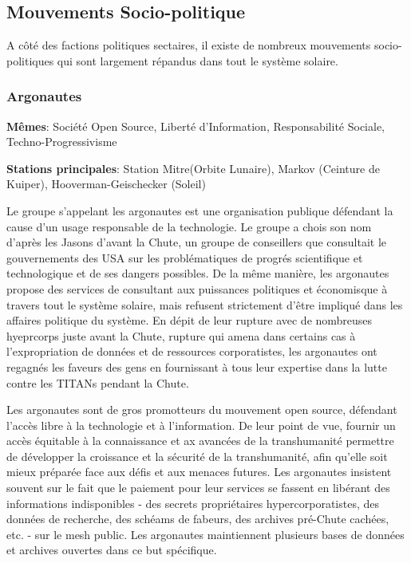 \subsection{Mouvements Socio-politique} \label{sec:socio-polit-movem} 

A côté des factions politiques sectaires, il existe de nombreux mouvements socio-politiques qui sont largement répandus dans tout le système solaire. 

\subsubsection{Argonautes} \label{sec:argonauts} 

\textbf{Mêmes}: Société Open Source, Liberté d'Information, Responsabilité Sociale, Techno-Progressivisme 

\textbf{Stations principales}: Station Mitre(Orbite Lunaire), Markov (Ceinture de Kuiper), Hooverman-Geischecker (Soleil) 

Le groupe s'appelant les argonautes est une organisation publique défendant la cause d'un usage responsable de la technologie. Le groupe a chois son nom d'après les Jasons d'avant la Chute, un groupe de conseillers que consultait le gouvernements des USA sur les problématiques de progrés scientifique et technologique et de ses dangers possibles. De la même manière, les argonautes propose des services de consultant aux puissances politiques et économisque à travers tout le système solaire, mais refusent strictement d'être impliqué dans les affaires politique du système. En dépit de leur rupture avec de nombreuses hyeprcorps juste avant la Chute, rupture qui amena dans certains cas à l'expropriation de données et de ressources corporatistes, les argonautes ont regagnés les faveurs des gens en fournissant à tous leur expertise dans la lutte contre les TITANs pendant la Chute. 

Les argonautes sont de gros promotteurs du mouvement open source, défendant l'accès libre à la technologie et à l'information. De leur point de vue, fournir un accès équitable à la connaissance et ax avancées de la transhumanité permettre de développer la croissance et la sécurité de la transhumanité, afin qu'elle soit mieux préparée face aux défis et aux menaces futures. Les argonautes insistent souvent sur le fait que le paiement pour leur services se fassent en libérant des informations indisponibles - des secrets propriétaires hypercorporatistes, des données de recherche, des schéams de fabeurs, des archives pré-Chute cachées, etc. - sur le mesh public. Les argonautes maintiennent plusieurs bases de données et archives ouvertes dans ce but spécifique. 


